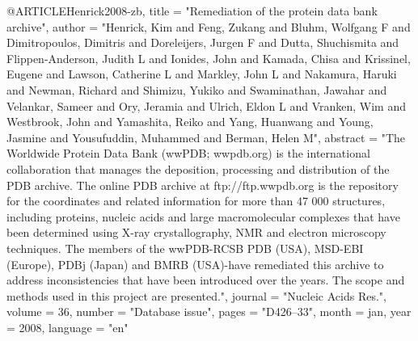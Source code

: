 
@ARTICLE{Henrick2008-zb,
  title    = "Remediation of the protein data bank archive",
  author   = "Henrick, Kim and Feng, Zukang and Bluhm, Wolfgang F and
              Dimitropoulos, Dimitris and Doreleijers, Jurgen F and Dutta,
              Shuchismita and Flippen-Anderson, Judith L and Ionides, John and
              Kamada, Chisa and Krissinel, Eugene and Lawson, Catherine L and
              Markley, John L and Nakamura, Haruki and Newman, Richard and
              Shimizu, Yukiko and Swaminathan, Jawahar and Velankar, Sameer and
              Ory, Jeramia and Ulrich, Eldon L and Vranken, Wim and Westbrook,
              John and Yamashita, Reiko and Yang, Huanwang and Young, Jasmine
              and Yousufuddin, Muhammed and Berman, Helen M",
  abstract = "The Worldwide Protein Data Bank (wwPDB; wwpdb.org) is the
              international collaboration that manages the deposition,
              processing and distribution of the PDB archive. The online PDB
              archive at ftp://ftp.wwpdb.org is the repository for the
              coordinates and related information for more than 47 000
              structures, including proteins, nucleic acids and large
              macromolecular complexes that have been determined using X-ray
              crystallography, NMR and electron microscopy techniques. The
              members of the wwPDB-RCSB PDB (USA), MSD-EBI (Europe), PDBj
              (Japan) and BMRB (USA)-have remediated this archive to address
              inconsistencies that have been introduced over the years. The
              scope and methods used in this project are presented.",
  journal  = "Nucleic Acids Res.",
  volume   =  36,
  number   = "Database issue",
  pages    = "D426--33",
  month    =  jan,
  year     =  2008,
  language = "en"
}

